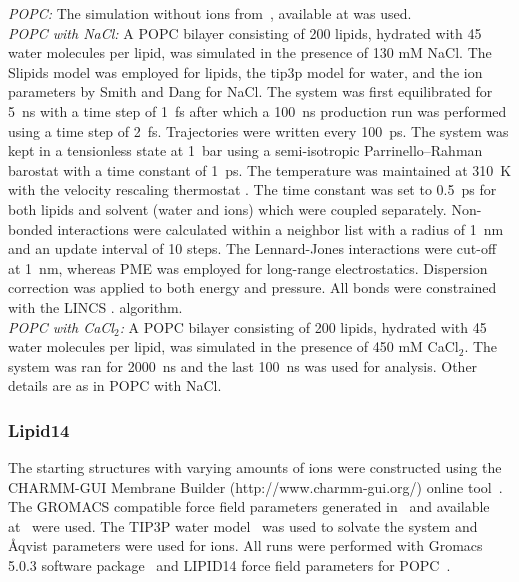 \documentclass[twoside,twocolumn,9pt]{article}
\begin{document}
{\it POPC:} The simulation without ions from~\cite{botan15}, available at \cite{slipidsFILESpopc} was used. \\
{\it POPC with NaCl:}
A POPC bilayer consisting of 200 lipids, hydrated with 45 water molecules per lipid, 
was simulated in the presence of 130 mM NaCl. 
The Slipids model \cite{jambeck12,jambeck12b}
was employed for lipids, the tip3p model \cite{jorgensen83} for water, and the ion parameters by Smith 
and Dang \cite{smith94} for NaCl. The system was first
equilibrated for 5~ns with a time step of 1~fs after which a 100~ns production run was performed using
a time step of 2~fs. Trajectories were written every 100~ps. The system was kept in a tensionless state at 1~bar 
using a semi-isotropic Parrinello--Rahman barostat \cite{parrinello81} with a time constant of 1~ps. 
The temperature was maintained at 310~K
with the velocity rescaling thermostat \cite{bussi07}. The time constant was set to 0.5~ps for both lipids and 
solvent (water and ions) which were coupled separately. Non-bonded interactions were calculated
within a neighbor list with a radius of 1~nm and an update interval of 10 steps. The Lennard-Jones
interactions were cut-off at 1~nm, whereas PME \cite{darden93,essman95} was employed for long-range electrostatics. 
Dispersion correction was applied to both energy and pressure. All bonds were constrained with the LINCS \cite{hess97,hess07}.
algorithm. \\
{\it POPC with CaCl$_2$:} A POPC bilayer consisting of 200 lipids, hydrated with 45 water molecules per lipid, 
was simulated in the presence of 450 mM CaCl$_2$. The system was ran for 2000~ns and the last 100~ns was used 
for analysis. Other details are as in POPC with NaCl.


\subsubsection{Lipid14}
The starting structures with varying amounts of ions were constructed using the CHARMM-GUI Membrane Builder (http://www.charmm-gui.org/) 
online tool~\cite{lee15}. The GROMACS compatible force field parameters generated in~\cite{botan15} and 
available at~\cite{lipid14files} were used. 
The TIP3P water model~\cite{jorgensen83} was used to solvate the system and \r{A}qvist \cite{aqvist90} parameters were used for ions.
All runs were performed with Gromacs 5.0.3 software package~\cite{abraham15}
and LIPID14 force field parameters for POPC~\cite{dickson14}. 
\end{document}
